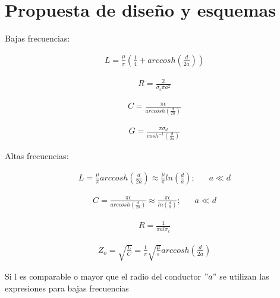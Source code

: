 \section{Propuesta de diseño y esquemas}

Bajas frecuencias:

\begin{align}
    L = \frac{\mu}{\pi}\left( \frac{1}{4} + arccosh \left( \frac{d}{2a} \right) \right)
\end{align}

\begin{align}
    R = \frac{2}{\sigma_c \pi a^2}
\end{align}

\begin{align}
    C = \frac{\pi \epsilon}{  arccosh \left( \frac{d}{2a} \right) }
\end{align}

\begin{align}
    G = \frac{\pi \sigma_d}{cosh^{-1} \left( \frac{d}{2a} \right)}
\end{align}

Altas frecuencias:

\begin{equation*}
        \begin{aligned}
        L =    \frac{\mu}{\pi}    arccosh \left( \frac{d}{2a} \right) \approx \frac{\mu }{ \pi } ln \left( \frac{d}{a} \right) \text{;} &\quad    a \ll d
        \end{aligned}
        \end{equation*}

\begin{equation*}
        \begin{aligned}
        C =  \frac{  \pi \epsilon  }{   arccosh \left( \frac{d}{2a} \right) } \approx \frac{\pi \epsilon}{ ln( \frac{d}{a} ) }    \text{;} &\quad    a \ll d
        \end{aligned}
        \end{equation*}

\begin{align}
    R = \frac{1}{\pi a l \sigma_c}
\end{align}

\begin{align}
    Z_o = \sqrt{\frac{L}{C}} = \frac{1}{\pi} \sqrt{\frac{\mu}{\epsilon}} arccosh \left( \frac{d}{2a} \right) 
\end{align}

Si l es comparable o mayor que el radio del conductor $"a"$ se utilizan las expresiones para bajas frecuencias 


